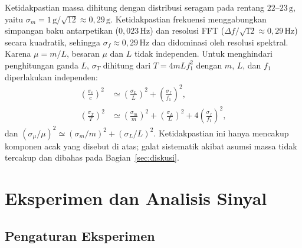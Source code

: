 \documentclass[aps,prl,twocolumn,superscriptaddress]{revtex4-2}
\begin{document}
    Ketidakpastian massa dihitung dengan distribusi seragam pada rentang $22$--$23\,\mathrm{g}$, yaitu $\sigma_m=1\,\mathrm{g}/\sqrt{12}\approx0{,}29\,\mathrm{g}$. 
    Ketidakpastian frekuensi menggabungkan simpangan baku antarpetikan ($0{,}023\,\mathrm{Hz}$) dan resolusi FFT ($\Delta f/\sqrt{12}\approx0{,}29\,\mathrm{Hz}$) secara kuadratik, sehingga $\sigma_{f}\approx0{,}29\,\mathrm{Hz}$ dan didominasi oleh resolusi spektral. 
    Karena $\mu=m/L$, besaran $\mu$ dan $L$ tidak independen. 
    Untuk menghindari penghitungan ganda $L$, $\sigma_T$ dihitung dari $T=4mLf_1^2$ dengan $m$, $L$, dan $f_1$ diperlakukan independen:
    \begin{align}
        \left(\frac{\sigma_c}{c}\right)^2 &\simeq \left(\frac{\sigma_L}{L}\right)^2+\left(\frac{\sigma_f}{f_1}\right)^2,\\
        \left(\frac{\sigma_T}{T}\right)^2 &\simeq \left(\frac{\sigma_m}{m}\right)^2+\left(\frac{\sigma_L}{L}\right)^2+4\left(\frac{\sigma_f}{f_1}\right)^2,
        \label{eq:uncertainty-T}
    \end{align}
    dan $(\sigma_\mu/\mu)^2\simeq(\sigma_m/m)^2+(\sigma_L/L)^2$. 
    Ketidakpastian ini hanya mencakup komponen acak yang disebut di atas; galat sistematik akibat asumsi massa tidak tercakup dan dibahas pada Bagian~\ref{sec:diskusi}.

\section{Eksperimen dan Analisis Sinyal}
\label{sec:eksperimen}

    \subsection{Pengaturan Eksperimen}
\end{document}
